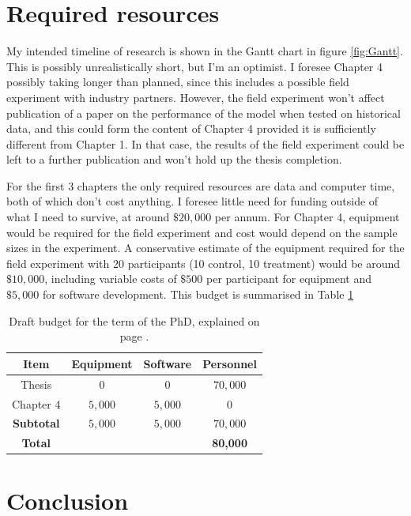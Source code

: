 \documentclass{article}
\begin{document}
\section{Required resources}\label{sec:resources}

My intended timeline of research is shown in the Gantt chart in figure \ref{fig:Gantt}. This is possibly unrealistically short, but I'm an optimist. I foresee Chapter 4 possibly taking longer than planned, since this includes a possible field experiment with industry partners. However, the field experiment won't affect publication of a paper on the performance of the model when tested on historical data, and this could form the content of Chapter 4 provided it is sufficiently different from Chapter 1. In that case, the results of the field experiment could be left to a further publication and won't hold up the thesis completion.

For the first 3 chapters the only required resources are data and computer time, both of which don't cost anything. I foresee little need for funding outside of what I need to survive, at around $\$20,000$ per annum. For Chapter 4, equipment would be required for the field experiment and cost would depend on the sample sizes in the experiment. A conservative estimate of the equipment required for the field experiment with 20 participants (10 control, 10 treatment) would be around $\$10,000$, including variable costs of $\$500$ per participant for equipment and $\$5,000$ for software development. This budget is summarised in Table \ref{tab:budget}

\begin{table}[!h]
\begin{center}
\begin{tabular}{c|c|c|c}
Item & Equipment & Software & Personnel \\
\hline
Thesis & 0 & 0 & $70,000$ \\
Chapter 4 & $5,000$ & $5,000$ & 0 \\
\hline
{\bf Subtotal} & $5,000$ & $5,000$ & $70,000$ \\
\hline
{\bf Total} &&& \textbf{80,000} \\
\hline
\end{tabular}
\caption{Draft budget for the term of the PhD, explained on page \pageref{sec:resources}.}\label{tab:budget}
\end{center}
\end{table}


\section{Conclusion}
\end{document}
